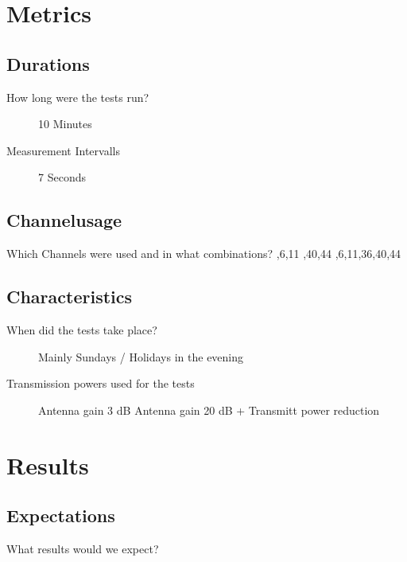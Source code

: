 \section{Metrics}
  \subsection{Durations}
    \begin{description}
     \item[How long were the tests run?]
      10 Minutes
     \item[Measurement Intervalls]
      7 Seconds
    \end{description}
  \subsection{Channelusage}
    Which Channels were used and in what combinations?   ,6,11 ,40,44 ,6,11,36,40,44 \newline
  \subsection{Characteristics}
    \begin{description}
     \item [When did the tests take place?]
      Mainly Sundays / Holidays in the evening \newline
     \item[Transmission powers used for the tests]
      Antenna gain 3 dB \newline
      Antenna gain 20 dB + Transmitt power reduction \newline
    \end{description}
\section{Results}
  \subsection{Expectations}
    What results would we expect?\newline
